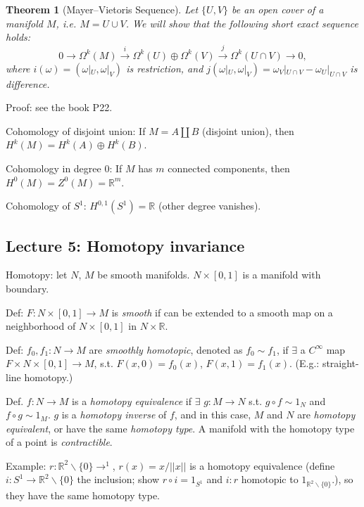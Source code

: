\documentclass{article}
\theoremstyle{mystyle}
\newtheorem*{theorem*}{Theorem}
\theoremstyle{remark}
\numberwithin{equation}{section}
\begin{document}
\begin{theorem*}[Mayer--Vietoris Sequence]
Let $\{U,V\}$ be an open cover of a manifold $M$, i.e. $M=U\cup V$. We will show that the following short exact sequence holds:
\begin{equation}
0\rightarrow \Omega^k(M)\xrightarrow{i} \Omega^k(U)\oplus \Omega^k(V)\xrightarrow{j} \Omega^k(U\cap V)\rightarrow 0,
\end{equation}
where $i(\omega) = (\omega|_U,\omega|_V)$ is restriction, and $j(\omega|_U,\omega|_V) = \omega_V|_{U\cap V} - \omega_U|_{U\cap V}$ is difference.
\end{theorem*}

\noindent Proof: see the book P22.

Cohomology of disjoint union: If $M = A\amalg B$ (disjoint union), then $H^k(M) = H^k(A)\oplus H^k(B)$. 

Cohomology in degree 0: If $M$ has $m$ connected components, then $H^0(M) = Z^0(M) = \mathbb{R}^m$.

Cohomology of $S^1$: $H^{0,1}(S^1)=\mathbb{R}$ (other degree vanishes).



\subsection{Lecture 5: Homotopy invariance}

Homotopy: let $N$, $M$ be smooth manifolds. $N\times[0,1]$ is a manifold with boundary.

Def: $F\colon N\times[0,1]\rightarrow M$ is \emph{smooth} if can be extended to a smooth map on a neighborhood of $N\times[0,1]$ in $N\times \mathbb{R}$.

Def: $f_0,f_1\colon N\rightarrow M$ are \emph{smoothly homotopic}, denoted as $f_0\sim f_1$, if $\exists$ a $C^\infty$ map $F\times N\times [0,1]\rightarrow M$, s.t. $F(x,0)=f_0(x)$, $F(x,1)=f_1(x)$. (E.g.: straight-line homotopy.)

Def. $f\colon N\rightarrow M$ is a \emph{homotopy equivalence} if $\exists$ $g\colon M\rightarrow N$ s.t. $g\circ f\sim 1_N$ and $f\circ g\sim 1_M$. $g$ is a \emph{homotopy inverse} of $f$, and in this case, $M$ and $N$ are \emph{homotopy equivalent}, or have the same \emph{homotopy type}. A manifold with the homotopy type of a point is \emph{contractible}.

Example: $r\colon \mathbb{R}^2\backslash\{0\} \rightarrow ^1$, $r(x) = x/||x||$ is a homotopy equivalence (define $i\colon S^1\rightarrow \mathbb{R}^2\backslash\{0\}$ the inclusion; show $r\circ i=1_{S^1}$ and $i\colon r$ homotopic to $1_{\mathbb{R}^2\backslash\{0\}}$.), so they have the same homotopy type.
\end{document}
